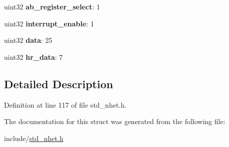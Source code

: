 \begin{DoxyCompactItemize}
uint32 {\bfseries ab\+\_\+register\+\_\+select}\+: 1
\item 
\mbox{\label{structecmp__format_a45cb694474c096f7a7620c767efbbfc1}} 
uint32 {\bfseries interrupt\+\_\+enable}\+: 1
\item 
\mbox{\label{structecmp__format_a23a09a402e0918b104d542388ff8bfbe}} 
uint32 {\bfseries data}\+: 25
\item 
\mbox{\label{structecmp__format_aa1a983aa97e63b8324ebe83e2739cf5c}} 
uint32 {\bfseries hr\+\_\+data}\+: 7
\end{DoxyCompactItemize}


\subsection{Detailed Description}


Definition at line 117 of file std\+\_\+nhet.\+h.



The documentation for this struct was generated from the following file\+:\begin{DoxyCompactItemize}
\item 
include/\mbox{\hyperlink{std__nhet_8h}{std\+\_\+nhet.\+h}}\end{DoxyCompactItemize}
